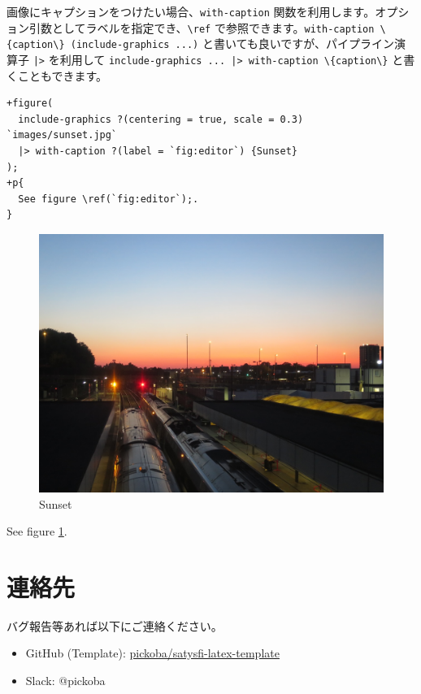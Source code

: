 画像にキャプションをつけたい場合、\verb$with-caption$ 関数を利用します。オプション引数としてラベルを指定でき、\verb$\ref$ で参照できます。\verb$with-caption \{caption\} (include-graphics ...)$ と書いても良いですが、パイプライン演算子 \verb$|>$ を利用して \verb$include-graphics ... |> with-caption \{caption\}$ と書くこともできます。

\begin{lstlisting}
+figure(
  include-graphics ?(centering = true, scale = 0.3) `images/sunset.jpg`
  |> with-caption ?(label = `fig:editor`) {Sunset}
);
+p{
  See figure \ref(`fig:editor`);.
}
\end{lstlisting}



\begin{figure}[h]
  \centering
  \includegraphics[keepaspectratio,scale=0.3]{images/sunset.jpg}
  \caption{Sunset}
  \label{fig:editor}
\end{figure}

\begin{oframed}
  
  See figure \ref{fig:editor}.
\end{oframed}

\section{連絡先}

バグ報告等あれば以下にご連絡ください。

\begin{itemize}
  \item GitHub (Template): \href{https://github.com/pickoba/satysfi-latex-template}{pickoba/satysfi-latex-template}
  \item \SATySFi  Slack: @pickoba
\end{itemize}
